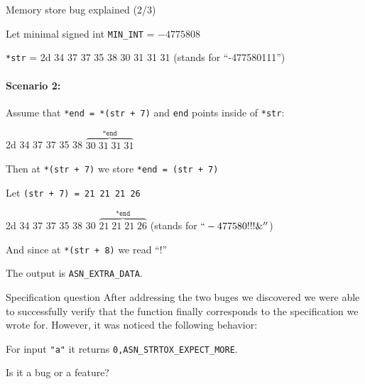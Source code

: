 \documentclass[10pt]{beamer}
\begin{document}
  \begin{frame}{Memory store bug explained (2/3)}

    Let minimal signed int \texttt{MIN\_INT} = $-4775808$ 

    \texttt{*str} = {\color{red}2d 34 37 37 35 38 30 31 31 31} (stands for ``-477580111'') 

    \paragraph{{\bf Scenario 2}:}

    Assume that \texttt{*end = *(str + 7)} and \texttt{end} points inside of \texttt{*str}:
    
    {\color{red}2d 34 37 37 35 38 {\color{blue} $\overbrace{30 \; 31 \; 31 \; 31}^{\texttt{*end}}$}}
    

    Then at \texttt{*(str + 7)} we store \texttt{*end = (str + 7)}

     Let \texttt{(str + 7) = 21 21 21 26} 

   
    {\color{red}2d 34 37 37 35 38 30 {\color{blue}$\overbrace{21 \; 21 \; 21 \; 26}^{\texttt{*end}}$}}
    (stands for $``-477580!!!\&''$)

    And since at \texttt{*(str + 8)} we read ``!'' 

    The output is \color{red}\texttt{ASN\_EXTRA\_DATA}.
    
    \end{frame}

\begin{frame}{Specification question}
After addressing the two buges we discovered we were able to successfully verify that the function finally corresponds to the specification we wrote for. However, it was noticed the following behavior:

For input \texttt{"a"} it returns {\color{green}\texttt{0,ASN\_STRTOX\_EXPECT\_MORE}}.

Is it a bug or a feature?

\end{frame}
\end{document}
